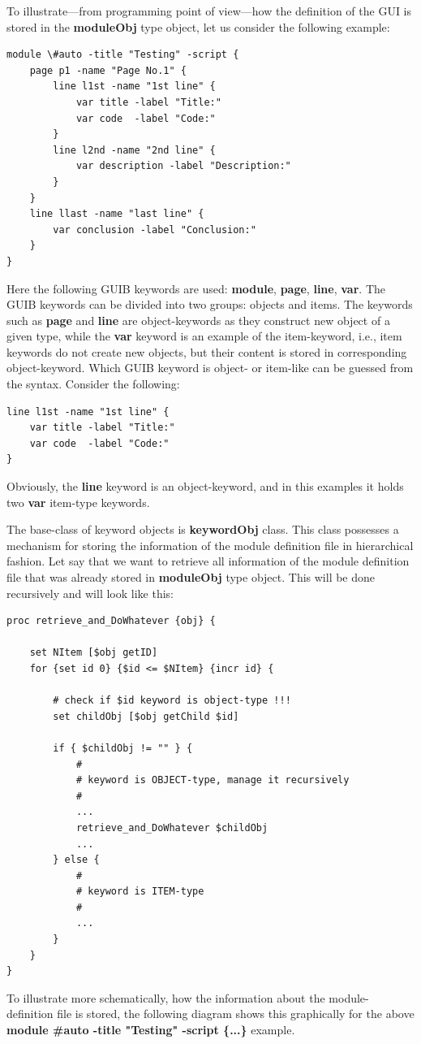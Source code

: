 \documentclass[12pt]{article}
\def\key#1{{\bf #1}}
\begin{document}
To illustrate---from programming point of view---how the definition of
the GUI is stored in the \key{moduleObj} type object, let us consider
the following example:

{\small
\begin{verbatim}
module \#auto -title "Testing" -script {
    page p1 -name "Page No.1" {
        line l1st -name "1st line" {
            var title -label "Title:"
            var code  -label "Code:"
        }
        line l2nd -name "2nd line" {
            var description -label "Description:"
        }
    }
    line llast -name "last line" {
        var conclusion -label "Conclusion:"
    }
}
\end{verbatim}
}

Here the following GUIB keywords are used: \key{module}, \key{page},
\key{line}, \key{var}. The GUIB keywords can be divided into two
groups: objects and items. The keywords such as \key{page} and
\key{line} are object-keywords as they construct new object of a given
type, while the \key{var} keyword is an example of the item-keyword,
i.e., item keywords do not create new objects, but their content is
stored in corresponding object-keyword. Which GUIB keyword is object-
or item-like can be guessed from the syntax. Consider the following:
{\small
\begin{verbatim}
line l1st -name "1st line" {
    var title -label "Title:"
    var code  -label "Code:"
}
\end{verbatim}
} Obviously, the \key{line} keyword is an object-keyword, and in this
examples it holds two \key{var} item-type keywords.

The base-class of keyword objects is \key{keywordObj} class. This
class possesses a mechanism for storing the information of the module
definition file in hierarchical fashion. Let say that we want to
retrieve all information of the module definition file that was
already stored in \key{moduleObj} type object. This will be done
recursively and will look like this:

{\small
\begin{verbatim}
proc retrieve_and_DoWhatever {obj} {

    set NItem [$obj getID]   
    for {set id 0} {$id <= $NItem} {incr id} {        

        # check if $id keyword is object-type !!!
        set childObj [$obj getChild $id]
        
        if { $childObj != "" } {
            #
            # keyword is OBJECT-type, manage it recursively
            #
            ...
            retrieve_and_DoWhatever $childObj
            ...
        } else {
            #
            # keyword is ITEM-type 
            #
            ...
        }
    }
}
\end{verbatim}
}
To illustrate more schematically, how the information about the
module-definition file is stored, the following diagram shows
this graphically for the above \key{module \#auto -title "Testing"
  -script \{...\}} example.
\end{document}
